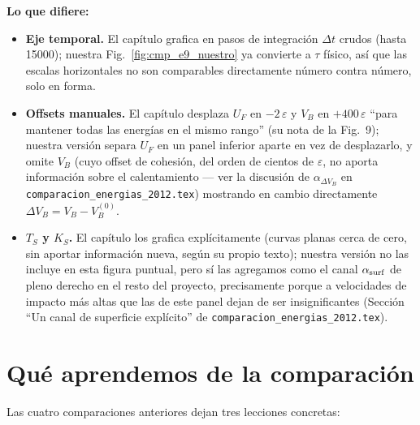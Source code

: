 \documentclass[11pt,a4paper]{article}
\newcommand{\eps}{\varepsilon}
\begin{document}
\textbf{Lo que difiere:}
\begin{itemize}[leftmargin=1.4em]
\item \textbf{Eje temporal.} El capítulo grafica en pasos de integración
$\Delta t$ crudos (hasta 15000); nuestra Fig.~\ref{fig:cmp_e9_nuestro} ya
convierte a $\tau$ físico, así que las escalas horizontales no son
comparables directamente número contra número, solo en forma.
\item \textbf{Offsets manuales.} El capítulo desplaza $U_F$ en $-2\,\eps$
y $V_B$ en $+400\,\eps$ ``para mantener todas las energías en el mismo
rango'' (su nota de la Fig.~9); nuestra versión separa $U_F$ en un panel
inferior aparte en vez de desplazarlo, y omite $V_B$ (cuyo offset de
cohesión, del orden de cientos de $\eps$, no aporta información sobre el
calentamiento --- ver la discusión de $\alpha_{\Delta V_B}$ en
\texttt{comparacion\_energias\_2012.tex}) mostrando en cambio
directamente $\Delta V_B=V_B-V_B^{(0)}$.
\item \textbf{$T_S$ y $K_S$.} El capítulo los grafica explícitamente
(curvas planas cerca de cero, sin aportar información nueva, según su
propio texto); nuestra versión no las incluye en esta figura puntual, pero
sí las agregamos como el canal $\alpha_{\rm surf}$ de pleno derecho en el
resto del proyecto, precisamente porque a velocidades de impacto más
altas que las de este panel dejan de ser insignificantes (Sección
``Un canal de superficie explícito'' de \texttt{comparacion\_energias\_2012.tex}).
\end{itemize}

\section{Qué aprendemos de la comparación}

Las cuatro comparaciones anteriores dejan tres lecciones concretas:
\end{document}
